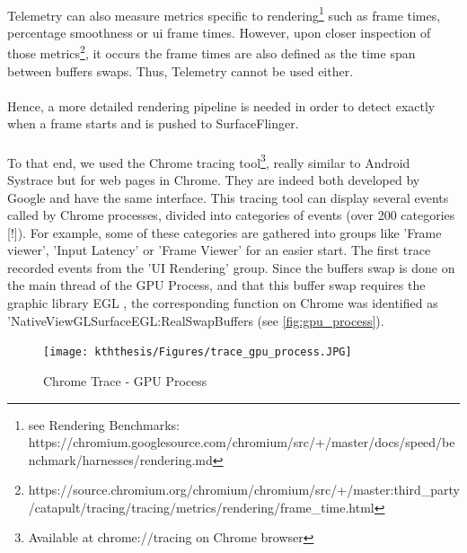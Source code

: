 \documentclass{kththesis}
\newcommand{\citationneeded}{\todo{Citation needed}[!]}
\begin{document}
 \paragraph{}
 Telemetry can also measure metrics specific to rendering\footnote{see Rendering Benchmarks: https://chromium.googlesource.com/chromium/src/+/master/docs/speed/benchmark/harnesses/rendering.md} such as frame times, percentage smoothness or ui frame times. However, upon closer inspection of those metrics\footnote{https://source.chromium.org/chromium/chromium/src/+/master:third_party/catapult/tracing/tracing/metrics/rendering/frame_time.html}, it occurs the frame times are also defined as the time span between buffers swaps. Thus, Telemetry cannot be used either.
 
 \paragraph{}
 Hence, a more detailed rendering pipeline is needed in order to detect exactly when a frame starts and is pushed to SurfaceFlinger.
 
 \paragraph{}
 To that end, we used the Chrome tracing tool\footnote{Available at chrome://tracing on Chrome browser}, really similar to Android Systrace but for web pages in Chrome. They are indeed both developed by Google and have the same interface. This tracing tool can display several events called by Chrome processes, divided into categories of events (over 200 categories \citationneeded). For example, some of these categories are gathered into groups like 'Frame viewer', 'Input Latency' or 'Frame Viewer' for an easier start. \newline
 The first trace recorded events from the 'UI Rendering' group. Since the buffers swap is done on the main thread of the GPU Process, and that this buffer swap requires the graphic library EGL 
 , the corresponding function on Chrome was identified as 'NativeViewGLSurfaceEGL:RealSwapBuffers (see \autoref{fig:gpu_process}).
 
 \begin{figure}[!ht]
     \centering
     \texttt{[image: kththesis/Figures/trace\_gpu\_process.JPG]}
     \caption{Chrome Trace - GPU Process}
     \label{fig:gpu_process}
 \end{figure}
 
\end{document}
